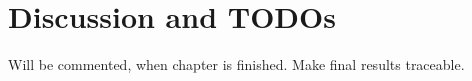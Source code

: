 \section{Discussion and TODOs}
Will be commented, when chapter is finished. Make final results traceable.

%
%
%
%
%

